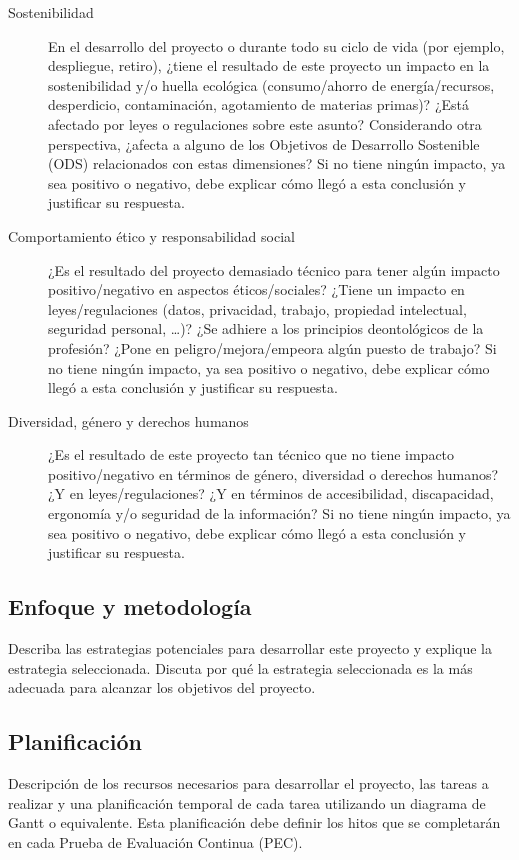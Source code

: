 \begin{description}
    \item[Sostenibilidad] En el desarrollo del proyecto o durante todo su ciclo de vida (por ejemplo, despliegue, retiro), ¿tiene el resultado de este proyecto un impacto en la sostenibilidad y/o huella ecológica (consumo/ahorro de energía/recursos, desperdicio, contaminación, agotamiento de materias primas)? ¿Está afectado por leyes o regulaciones sobre este asunto? Considerando otra perspectiva, ¿afecta a alguno de los Objetivos de Desarrollo Sostenible (ODS) relacionados con estas dimensiones? Si no tiene ningún impacto, ya sea positivo o negativo, debe explicar cómo llegó a esta conclusión y justificar su respuesta.
    \item[Comportamiento ético y responsabilidad social] ¿Es el resultado del proyecto demasiado técnico para tener algún impacto positivo/negativo en aspectos éticos/sociales? ¿Tiene un impacto en leyes/regulaciones (datos, privacidad, trabajo, propiedad intelectual, seguridad personal, …)? ¿Se adhiere a los principios deontológicos de la profesión? ¿Pone en peligro/mejora/empeora algún puesto de trabajo? Si no tiene ningún impacto, ya sea positivo o negativo, debe explicar cómo llegó a esta conclusión y justificar su respuesta.
    \item[Diversidad, género y derechos humanos] ¿Es el resultado de este proyecto tan técnico que no tiene impacto positivo/negativo en términos de género, diversidad o derechos humanos? ¿Y en leyes/regulaciones? ¿Y en términos de accesibilidad, discapacidad, ergonomía y/o seguridad de la información? Si no tiene ningún impacto, ya sea positivo o negativo, debe explicar cómo llegó a esta conclusión y justificar su respuesta.
\end{description}

\subsection{Enfoque y metodología}

Describa las estrategias potenciales para desarrollar este proyecto y explique la estrategia seleccionada. Discuta por qué la estrategia seleccionada es la más adecuada para alcanzar los objetivos del proyecto.

\subsection{Planificación}

Descripción de los recursos necesarios para desarrollar el proyecto, las tareas a realizar y una planificación temporal de cada tarea utilizando un diagrama de Gantt o equivalente. Esta planificación debe definir los hitos que se completarán en cada Prueba de Evaluación Continua (PEC).

